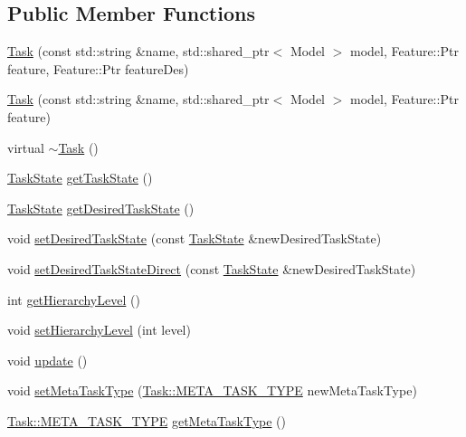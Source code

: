 \subsection*{Public Member Functions}
\begin{DoxyCompactItemize}
\item 
\hyperlink{classocra_1_1Task_abf071538753cbbc6af21f98644d978cc}{Task} (const std\+::string \&name, std\+::shared\+\_\+ptr$<$ Model $>$ model, Feature\+::\+Ptr feature, Feature\+::\+Ptr feature\+Des)
\item 
\hyperlink{classocra_1_1Task_ace0cba5936451a6423e8f341746adfd3}{Task} (const std\+::string \&name, std\+::shared\+\_\+ptr$<$ Model $>$ model, Feature\+::\+Ptr feature)
\item 
virtual \hyperlink{classocra_1_1Task_a3949d2c52bc43f373b8cc039da304b87}{$\sim$\+Task} ()
\item 
\hyperlink{classocra_1_1TaskState}{Task\+State} \hyperlink{classocra_1_1Task_a81def8087dc41ef0a02406f208be4833}{get\+Task\+State} ()
\item 
\hyperlink{classocra_1_1TaskState}{Task\+State} \hyperlink{classocra_1_1Task_a22cb1cd88dda7477d2594b9851f86301}{get\+Desired\+Task\+State} ()
\item 
void \hyperlink{classocra_1_1Task_ac14252b35faa2ed8eed4cc5db629ce94}{set\+Desired\+Task\+State} (const \hyperlink{classocra_1_1TaskState}{Task\+State} \&new\+Desired\+Task\+State)
\item 
void \hyperlink{classocra_1_1Task_a44ccc493a8a4931e11c3fcfcd30d991c}{set\+Desired\+Task\+State\+Direct} (const \hyperlink{classocra_1_1TaskState}{Task\+State} \&new\+Desired\+Task\+State)
\item 
int \hyperlink{classocra_1_1Task_a244bb1942ffb8788fd7b8dba560f5b09}{get\+Hierarchy\+Level} ()
\item 
void \hyperlink{classocra_1_1Task_a07617befcfa5bf8f0711d47965ed8337}{set\+Hierarchy\+Level} (int level)
\item 
void \hyperlink{classocra_1_1Task_ad15d68848234ddac27ea57af1915045f}{update} ()
\item 
void \hyperlink{classocra_1_1Task_a0e4fc6a68b13d3b70798db1ff7233faf}{set\+Meta\+Task\+Type} (\hyperlink{classocra_1_1Task_a8ddf2840d178ca273e886c9ca95248fe}{Task\+::\+M\+E\+T\+A\+\_\+\+T\+A\+S\+K\+\_\+\+T\+Y\+PE} new\+Meta\+Task\+Type)
\item 
\hyperlink{classocra_1_1Task_a8ddf2840d178ca273e886c9ca95248fe}{Task\+::\+M\+E\+T\+A\+\_\+\+T\+A\+S\+K\+\_\+\+T\+Y\+PE} \hyperlink{classocra_1_1Task_a89d970771d25b28149d51768f37118d5}{get\+Meta\+Task\+Type} ()

\end{DoxyCompactItemize}

